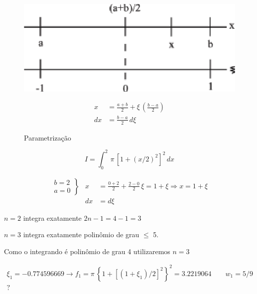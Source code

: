 \begin{enumerate}
\begin{figure}[htb]
 \centering
 \begin{minipage}[c]{7cm}
    \includegraphics[scale=0.8]{capitulos/capitulo2/figuras/quadraturas_de_gauss1.eps}
    \caption{Parametrização}
    \label{fig:quadraturas_de_gauss1}
 \end{minipage}\hspace*{1cm}
 \begin{minipage}[c]{6cm}
     \[
      \begin{array}{ll}
       x & = \displaystyle \frac{a+b}{2} + \xi \, \left(\frac{b-a}{2}\right) \\
       dx & = \displaystyle \frac{b-a}{2} \, d\xi
      \end{array}
     \]
 \end{minipage}
\end{figure}

\begin{example}
\[
 I = \int_0^2 \, \pi \, [1 + (x/2)^2]^2 \, dx
\]

\[
 \begin{array}{lll}
 \left.
 \begin{array}{l}
  b = 2 \\
  a = 0
 \end{array}
 \right\}
 & x & = \displaystyle \frac{0+2}{2} + \displaystyle \frac{2-0}{2} \, \xi = 1 + \xi \Rightarrow x = 1 + \xi \\
 & dx & = d\xi
 \end{array}
\]

$n=2$ integra exatamente $2n-1 = 4-1 = 3$

$n=3$ integra exatamente polinômio de grau $\leq$ 5.

Como o integrando é polinômio de grau 4 utilizaremos $n=3$

\[
\begin{array}{l}
 \xi_1 = - 0.774596669 \rightarrow f_1 = \pi \, \left\{ 1 + \left[ (1+\xi_1)/2 \right]^2 \right\}^2 = 3.2219064 \qquad w_1=5/9 \\
 ?
\end{array}
\]


\end{example}
\end{enumerate}
